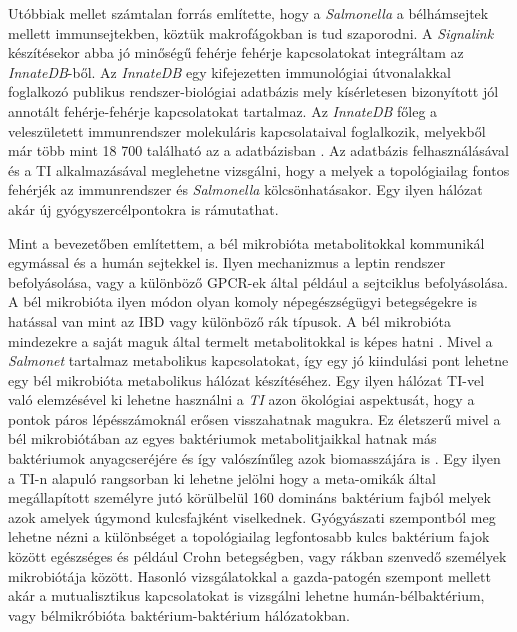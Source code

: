 \documentclass[a4paper,12pt]{article}
\begin{document}
		Utóbbiak mellet számtalan forrás \cite{salmonella_and_host_cell_nature} \cite{salmonella_autophagy_nature_old} \cite{hilD} említette, hogy a \textit{Salmonella} a bélhámsejtek mellett immunsejtekben, köztük makrofágokban is tud szaporodni. A \textit{Signalink} készítésekor abba jó minőségű fehérje fehérje kapcsolatokat integráltam az \textit{InnateDB}-ből. Az \textit{InnateDB} egy kifejezetten immunológiai útvonalakkal foglalkozó publikus rendszer-biológiai adatbázis mely kísérletesen bizonyított jól annotált fehérje-fehérje kapcsolatokat tartalmaz. Az \textit{InnateDB} főleg a veleszületett immunrendszer molekuláris kapcsolataival foglalkozik, melyekből már több mint 18 700 található az a adatbázisban \cite{innatedb}. Az adatbázis felhasználásával és a TI alkalmazásával meglehetne vizsgálni, hogy a melyek a topológiailag fontos fehérjék az immunrendszer és \textit{Salmonella} kölcsönhatásakor. Egy ilyen hálózat akár új gyógyszercélpontokra is rámutathat.

		Mint a bevezetőben említettem, a bél mikrobióta metabolitokkal kommunikál egymással és a humán sejtekkel is. Ilyen mechanizmus a leptin rendszer befolyásolása, vagy a különböző GPCR-ek által például a sejtciklus befolyásolása\cite{buthyrate_immune}.  A bél mikrobióta ilyen módon olyan komoly népegészségügyi betegségekre is hatással van mint az IBD vagy különböző rák típusok\cite{gut_microbiome}.  A bél mikrobióta mindezekre a saját maguk által termelt metabolitokkal is képes hatni \cite{scfa_and_vitamine}. Mivel a \textit{Salmonet} tartalmaz metabolikus kapcsolatokat, így egy jó kiindulási pont lehetne egy bél mikrobióta metabolikus hálózat készítéséhez. Egy ilyen hálózat TI-vel való elemzésével ki lehetne használni a \textit{TI} azon ökológiai aspektusát, hogy a pontok páros lépésszámoknál erősen visszahatnak magukra. Ez életszerű mivel a bél mikrobiótában az egyes baktériumok metabolitjaikkal hatnak más baktériumok anyagcseréjére és így valószínűleg azok biomasszájára is \cite{gut_microbiome}.  Egy ilyen a TI-n alapuló rangsorban ki lehetne jelölni hogy a meta-omikák által megállapított személyre jutó körülbelül 160 domináns baktérium fajból \cite{meta_omics} melyek azok amelyek úgymond kulcsfajként viselkednek. Gyógyászati szempontból meg lehetne nézni a különbséget a topológiailag legfontosabb kulcs baktérium fajok között egészséges és például Crohn betegségben, vagy rákban szenvedő személyek mikrobiótája között. Hasonló vizsgálatokkal a gazda-patogén szempont mellett akár a mutualisztikus kapcsolatokat is vizsgálni lehetne humán-bélbaktérium, vagy bélmikróbióta baktérium-baktérium hálózatokban.
\end{document}
